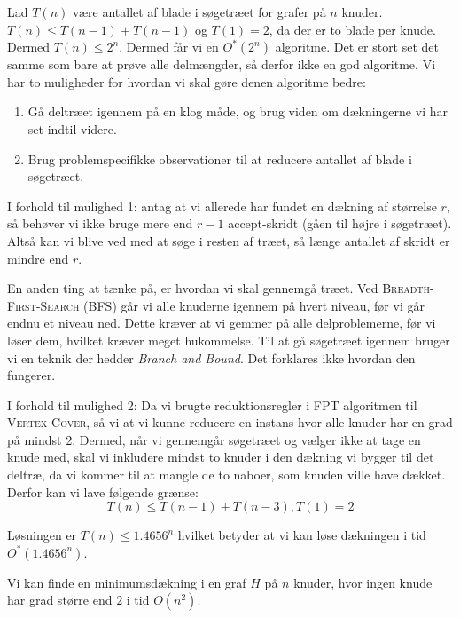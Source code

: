 Lad $T(n)$ være antallet af blade i søgetræet for grafer på $n$ knuder. $T(n) \le T(n-1) + T(n-1)$ og $T(1) = 2$, da der er to blade per knude. Dermed $T(n) \le 2^n$. Dermed får vi en $O^{*}(2^{n})$ algoritme. Det er stort set det samme som bare at prøve alle delmængder, så derfor ikke en god algoritme. Vi har to muligheder for hvordan vi skal gøre denen algoritme bedre:
\begin{enumerate}
	\item Gå deltræet igennem på en klog måde, og brug viden om dækningerne vi har set indtil videre.
	\item Brug problemspecifikke observationer til at reducere antallet af blade i søgetræet.
\end{enumerate}

I forhold til mulighed 1: antag at vi allerede har fundet en dækning af størrelse $r$, så behøver vi ikke bruge mere end $r-1$ accept-skridt (gåen til højre i søgetræet). Altså kan vi blive ved med at søge i resten af træet, så længe antallet af skridt er mindre end $r$.

En anden ting at tænke på, er hvordan vi skal gennemgå træet. Ved \textsc{Breadth-First-Search} (BFS) går vi alle knuderne igennem på hvert niveau, før vi går endnu et niveau ned. Dette kræver at vi gemmer på alle delproblemerne, før vi løser dem, hvilket kræver meget hukommelse. Til at gå søgetræet igennem bruger vi en teknik der hedder \textit{Branch and Bound}. Det forklares ikke hvordan den fungerer.

I forhold til mulighed 2: Da vi brugte reduktionsregler i FPT algoritmen til \textsc{Vertex-Cover}, så vi at vi kunne reducere en instans hvor alle knuder har en grad på mindst 2. Dermed, når vi gennemgår søgetræet og vælger ikke at tage en knude med, skal vi inkludere mindst to knuder i den dækning vi bygger til det deltræ, da vi kommer til at mangle de to naboer, som knuden ville have dækket. Derfor kan vi lave følgende grænse:
\begin{equation*}
	T(n) \le T(n-1) + T(n-3), T(1) = 2
\end{equation*}

Løsningen er $T(n) \le 1.4656^{n}$ hvilket betyder at vi kan løse dækningen i tid $O^{*}(1.4656^{n})$.

\begin{lemma}
	\label{lemma:2knudern2}
	Vi kan finde en minimumsdækning i en graf $H$ på $n$ knuder, hvor ingen knude har grad større end $2$ i tid $O(n^{2})$.
\end{lemma}

